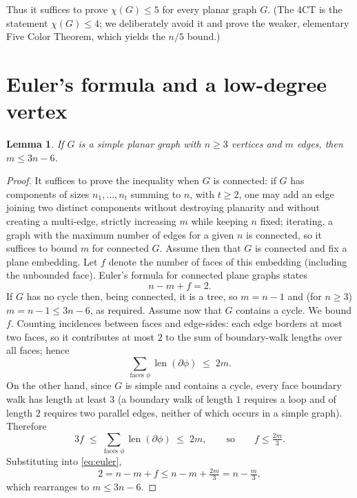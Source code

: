 \documentclass{amsart}
\newtheorem{lemma}{Lemma}
\theoremstyle{remark}
\begin{document}
Thus it suffices to prove $\chi(G)\le 5$ for every planar graph $G$. (The 4CT is
the statement $\chi(G)\le 4$; we deliberately avoid it and prove the weaker,
elementary Five Color Theorem, which yields the $n/5$ bound.)

\section{Euler's formula and a low-degree vertex}

\begin{lemma}\label{lem:edges}
If $G$ is a simple planar graph with $n\ge 3$ vertices and $m$ edges, then
$m\le 3n-6$.
\end{lemma}

\begin{proof}
It suffices to prove the inequality when $G$ is connected: if $G$ has components
of sizes $n_1,\dots,n_t$ summing to $n$, with $t\ge2$, one may add an edge
joining two distinct components without destroying planarity and without creating
a multi-edge, strictly increasing $m$ while keeping $n$ fixed; iterating, a graph
with the maximum number of edges for a given $n$ is connected, so it suffices to
bound $m$ for connected $G$. Assume then that $G$ is connected and fix a plane
embedding. Let $f$ denote the number of faces of this embedding (including the
unbounded face). Euler's formula for connected plane graphs states
\begin{equation}\label{eq:euler}
   n - m + f = 2 .
\end{equation}
If $G$ has no cycle then, being connected, it is a tree, so $m=n-1$ and (for
$n\ge3$) $m=n-1\le 3n-6$, as required. Assume now that $G$ contains a cycle. We
bound $f$. Counting incidences between faces and edge-sides: each edge borders at
most two faces, so it contributes at most $2$ to the sum of boundary-walk lengths
over all faces; hence
\[
   \sum_{\text{faces } \phi}\operatorname{len}(\partial\phi)\;\le\;2m .
\]
On the other hand, since $G$ is simple and contains a cycle, every face boundary
walk has length at least $3$ (a boundary walk of length $1$ requires a loop and
of length $2$ requires two parallel edges, neither of which occurs in a simple
graph). Therefore
\[
   3f \;\le\; \sum_{\text{faces } \phi}\operatorname{len}(\partial\phi)\;\le\;2m,
   \qquad\text{so}\qquad f\le \tfrac{2m}{3}.
\]
Substituting into \eqref{eq:euler},
\[
   2 = n-m+f \le n - m + \tfrac{2m}{3} = n - \tfrac{m}{3},
\]
which rearranges to $m\le 3n-6$.
\end{proof}
\end{document}
